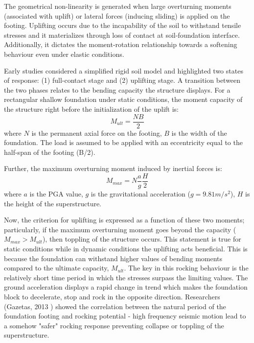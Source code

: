 \documentclass[12pt,a4paper]{report}
\begin{document}
The geometrical non-linearity is generated when large overturning moments (associated with uplift) or lateral forces (inducing sliding) is applied on the footing. Uplifting occurs due to the incapability of the soil to withstand tensile stresses and it materializes through loss of contact at soil-foundation interface. Additionally, it dictates the moment-rotation relationship towards a softening behaviour even under elastic conditions.

Early studies considered a simplified rigid soil model and highlighted two states of response: (1) full-contact stage and (2) uplifting stage. A transition between the two phases relates to the bending capacity the structure displays. For a rectangular shallow foundation under static conditions, the moment capacity of the structure right before the initialization of the uplift is:
\begin{equation}
	M_{ult}= \frac{N B}{2}
\end{equation}
 where $N$ is the permanent axial force on the footing, $B$ is the width of the foundation. The load is assumed to be applied with an eccentricity equal to the half-span of the footing (B/2). 
 
 Further, the maximum overturning moment induced by inertial forces is:
 \begin{equation}
 	M_{max}= N \frac{a}{g}\frac{H}{2}
 \end{equation}
where $a$ is the PGA value, $g$ is the gravitational acceleration ($g=9.81m/s^2$), $H$ is the height of the superstructure.

Now, the criterion for uplifting is expressed as a function of these two moments; particularly, if the maximum overturning moment goes beyond the capacity ($M_{max}>M_{ult}$), then toppling of the structure occurs. This statement is true for static conditions while in dynamic conditions the uplifting acts beneficial. This is because the foundation can withstand higher values of bending moments compared to the ultimate capacity, $M_{ult}$. The key in this rocking behaviour is the relatively short time period in which the stresses surpass the limiting values. The ground acceleration displays a rapid change in trend which makes the foundation block to decelerate, stop and rock in the opposite direction. Researchers (Gazetas, 2013 \cite{gazetas2013can}) showed the correlation between the natural period of the foundation footing and rocking potential - high frequency seismic motion lead to a somehow "safer" rocking response preventing collapse or toppling of the superstructure. 
\end{document}
